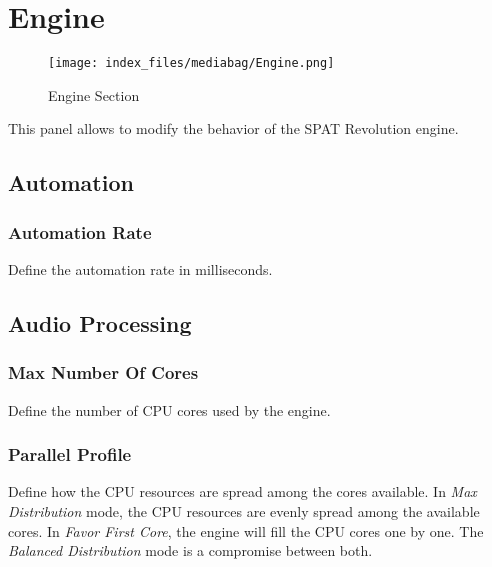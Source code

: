 \documentclass[
  letterpaper,
  DIV=11,
  numbers=noendperiod]{scrreport}
\begin{document}
\hypertarget{engine}{%
\section{Engine}\label{engine}}

\begin{figure}

{\centering \texttt{[image: index\_files/mediabag/Engine.png]}

}

\caption{Engine Section}

\end{figure}

This panel allows to modify the behavior of the SPAT Revolution engine.

\hypertarget{automation}{%
\subsection{Automation}\label{automation}}

\hypertarget{automation-rate}{%
\subsubsection{Automation Rate}\label{automation-rate}}

Define the automation rate in milliseconds.

\hypertarget{audio-processing}{%
\subsection{Audio Processing}\label{audio-processing}}

\hypertarget{max-number-of-cores}{%
\subsubsection{Max Number Of Cores}\label{max-number-of-cores}}

Define the number of CPU cores used by the engine.

\hypertarget{parallel-profile}{%
\subsubsection{Parallel Profile}\label{parallel-profile}}

Define how the CPU resources are spread among the cores available. In
\emph{Max Distribution} mode, the CPU resources are evenly spread among
the available cores. In \emph{Favor First Core}, the engine will fill
the CPU cores one by one. The \emph{Balanced Distribution} mode is a
compromise between both.
\end{document}
